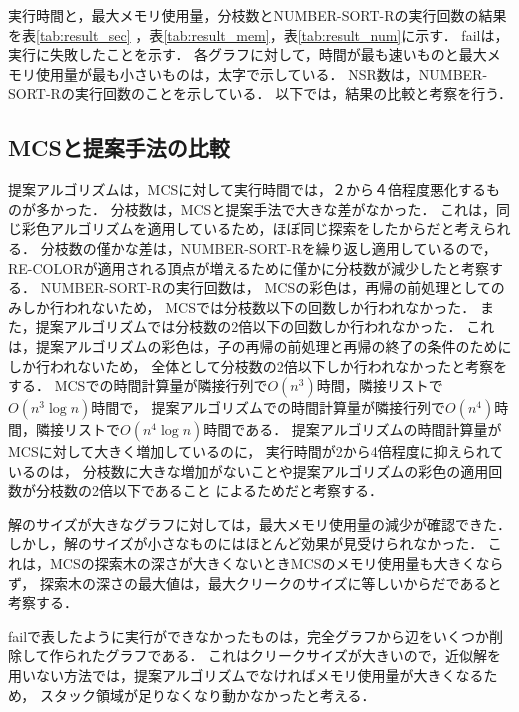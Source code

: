 実行時間と，最大メモリ使用量，分枝数とNUMBER-SORT-Rの実行回数の結果を表\ref{tab:result_sec} ，表\ref{tab:result_mem}，表\ref{tab:result_num}に示す．
failは，実行に失敗したことを示す．
各グラフに対して，時間が最も速いものと最大メモリ使用量が最も小さいものは，太字で示している．
NSR数は，NUMBER-SORT-Rの実行回数のことを示している．
以下では，結果の比較と考察を行う．

\subsection{MCSと提案手法の比較}
提案アルゴリズムは，MCSに対して実行時間では，２から４倍程度悪化するものが多かった．
分枝数は，MCSと提案手法で大きな差がなかった．
これは，同じ彩色アルゴリズムを適用しているため，ほぼ同じ探索をしたからだと考えられる．
分枝数の僅かな差は，NUMBER-SORT-Rを繰り返し適用しているので，
RE-COLORが適用される頂点が増えるために僅かに分枝数が減少したと考察する．
NUMBER-SORT-Rの実行回数は，
MCSの彩色は，再帰の前処理としてのみしか行われないため，
MCSでは分枝数以下の回数しか行われなかった．
また，提案アルゴリズムでは分枝数の2倍以下の回数しか行われなかった．
これは，提案アルゴリズムの彩色は，子の再帰の前処理と再帰の終了の条件のためにしか行われないため，
全体として分枝数の2倍以下しか行われなかったと考察をする．
MCSでの時間計算量が隣接行列で$O(n^3)$時間，隣接リストで$O(n^3 \log n )$時間で，
提案アルゴリズムでの時間計算量が隣接行列で$O(n^4)$時間，隣接リストで$O(n^4 \log n )$時間である．
提案アルゴリズムの時間計算量がMCSに対して大きく増加しているのに，
実行時間が2から4倍程度に抑えられているのは，
分枝数に大きな増加がないことや提案アルゴリズムの彩色の適用回数が分枝数の2倍以下であること
によるためだと考察する．

解のサイズが大きなグラフに対しては，最大メモリ使用量の減少が確認できた．
しかし，解のサイズが小さなものにはほとんど効果が見受けられなかった．
これは，MCSの探索木の深さが大きくないときMCSのメモリ使用量も大きくならず，
探索木の深さの最大値は，最大クリークのサイズに等しいからだであると考察する．

failで表したように実行ができなかったものは，完全グラフから辺をいくつか削除して作られたグラフである．
これはクリークサイズが大きいので，近似解を用いない方法では，提案アルゴリズムでなければメモリ使用量が大きくなるため，
スタック領域が足りなくなり動かなかったと考える．
